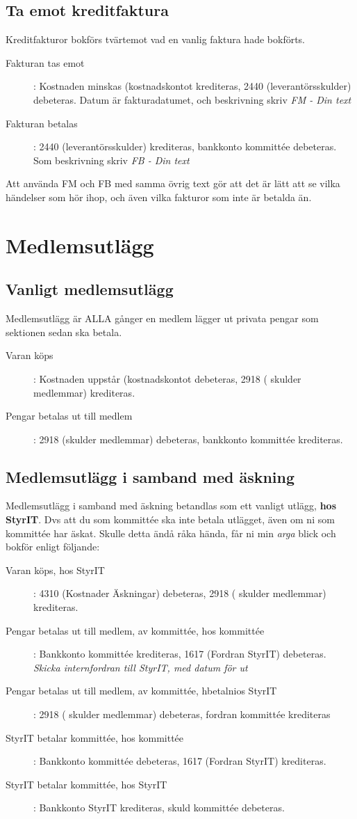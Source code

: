 \documentclass{article}
\begin{document}
\subsection{Ta emot kreditfaktura}
Kreditfakturor bokförs tvärtemot vad en vanlig faktura hade bokförts.
\begin{description}
    \item [Fakturan tas emot]: Kostnaden minskas (kostnadskontot krediteras, 2440 (leverantörsskulder) debeteras. Datum är fakturadatumet, och beskrivning skriv \textit{FM - Din text}
    \item [Fakturan betalas]: 2440 (leverantörsskulder) krediteras, bankkonto kommittée debeteras. Som beskrivning skriv \textit{FB - Din text}
\end{description}
Att använda FM och FB med samma övrig text gör att det är lätt att se vilka händelser som hör ihop, och även vilka fakturor som inte är betalda än.


\section{Medlemsutlägg}
\subsection{Vanligt medlemsutlägg}
Medlemsutlägg är ALLA gånger en medlem lägger ut privata pengar som sektionen sedan ska betala. 
\begin{description}
    \item [Varan köps]: Kostnaden uppstår (kostnadskontot debeteras, 2918 ( skulder medlemmar) krediteras.
    \item [Pengar betalas ut till medlem]: 2918 (skulder medlemmar) debeteras, bankkonto kommittée krediteras.
\end{description}
\subsection{Medlemsutlägg i samband med äskning}
Medlemsutlägg i samband med äskning betandlas som ett vanligt utlägg, \textbf{hos StyrIT}. Dvs att du som kommittée ska inte betala utlägget, även om ni som kommittée har äskat. Skulle detta ändå råka hända, får ni min \textit{arga} blick och bokför enligt följande: 
\begin{description}
    \item [Varan köps, hos StyrIT]: 4310 (Kostnader Äskningar) debeteras, 2918 ( skulder medlemmar) krediteras.
    \item [Pengar betalas ut till medlem, av kommittée, hos kommittée]: Bankkonto kommittée krediteras, 1617 (Fordran StyrIT) debeteras. \textit{Skicka internfordran till StyrIT, med datum för ut}
    \item [Pengar betalas ut till medlem, av kommittée, hbetalnios StyrIT]: 2918 ( skulder medlemmar) debeteras, fordran kommittée krediteras
    \item [StyrIT betalar kommittée, hos kommittée] : Bankkonto kommittée debeteras, 1617 (Fordran StyrIT) krediteras.
    \item [StyrIT betalar kommittée, hos StyrIT] : Bankkonto StyrIT krediteras,  skuld kommittée debeteras.
\end{description}
\end{document}
